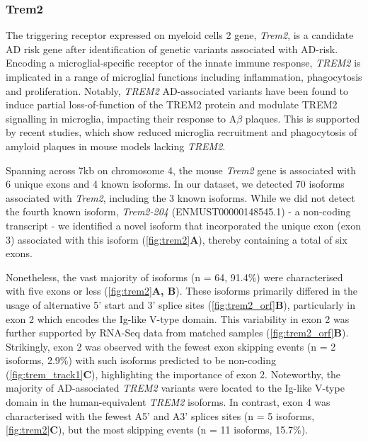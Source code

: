 \newpage
\subsubsection{Trem2}
\label{ch5: trem2_annotation}
The triggering receptor expressed on myeloid cells 2 gene, \textit{Trem2}, is a candidate AD risk gene after identification of genetic variants associated with AD-risk. Encoding a microglial-specific receptor of the innate immune response, \textit{TREM2} is implicated in a range of microglial functions including inflammation, phagocytosis and proliferation. Notably, \textit{TREM2} AD-associated variants have been found to induce partial loss-of-function of the TREM2 protein and modulate TREM2 signalling in microglia, impacting their response to A$\beta$ plaques\cite{Kober2016, Guerreiro2013a}. This is supported by recent studies, which show reduced microglia recruitment and phagocytosis of amyloid plaques in mouse models lacking \textit{TREM2}\cite{Wang2015a}. 

Spanning across 7kb on chromosome 4, the mouse \textit{Trem2} gene is associated with 6 unique exons and 4 known isoforms. In our dataset, we detected 70 isoforms associated with \textit{Trem2}, including the 3 known isoforms. While we did not detect the fourth known isoform, \textit{Trem2-204} (ENMUST00000148545.1) - a non-coding transcript - we identified a novel isoform that incorporated the unique exon (exon 3) associated with this isoform (\cref{fig:trem2}\textbf{A}), thereby containing a total of six exons.   

Nonetheless, the vast majority of isoforms (n = 64, 91.4\%) were characterised with five exons or less (\cref{fig:trem2}\textbf{A, B}). These isoforms primarily differed in the usage of alternative 5' start and 3' splice sites (\cref{fig:trem2_orf}\textbf{B}), particularly in exon 2 which encodes the Ig-like V-type domain. This variability in exon 2 was further supported by RNA-Seq data from matched samples (\cref{fig:trem2_orf}\textbf{B}). Strikingly, exon 2 was observed with the fewest exon skipping events (n = 2 isoforms, 2.9\%) with such isoforms predicted to be non-coding (\cref{fig:trem_track1}\textbf{C}), highlighting the importance of exon 2. Noteworthy, the majority of AD-associated \textit{TREM2} variants were located to the Ig-like V-type domain in the human-equivalent \textit{TREM2} isoforms. In contrast, exon 4 was characterised with the fewest A5' and A3' splices sites (n = 5 isoforms, \cref{fig:trem2}\textbf{C}), but the most skipping events (n = 11 isoforms, 15.7\%). 


